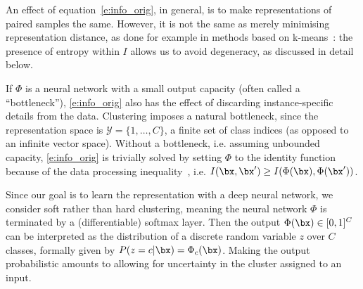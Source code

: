 An effect of equation~\cref{e:info_orig}, in general, is to make representations of paired samples the same.
However, it is not the same as merely minimising representation distance, as done for example in methods based on k-means~\cite{caron2018deep,haeusser2018associative}: the presence of entropy within $I$ allows us to avoid degeneracy, as discussed in detail below.



If $\Phi$ is a neural network with a small output capacity (often called a ``bottleneck''), \cref{e:info_orig} also has the effect of discarding instance-specific details from the data.
Clustering imposes a natural bottleneck, since the representation space is $\mathcal{Y}=\{1,\dots,C\}$, a finite set of class indices (as opposed to an infinite vector space). 
Without a bottleneck, i.e. assuming unbounded capacity, \cref{e:info_orig} is trivially solved by setting $\Phi$ to the identity function because of the data processing inequality~\cite{cover2012elements}, i.e. $I(\bx, \bx') \geq I(\Phi(\bx), \Phi(\bx'))$.

\newcommand{\bPhi}{\Phi}

Since our goal is to learn the representation with a deep neural network, we consider soft rather than hard clustering, meaning the neural network $\bPhi$ is terminated by a (differentiable) softmax layer.
Then the output $\bPhi(\bx) \in [0,1]^C$ can be interpreted as the distribution of a discrete random variable $z$ over $C$ classes, formally given by $P(z = c|\bx) = \bPhi_c(\bx)$. Making the output probabilistic amounts to allowing for uncertainty in the cluster assigned to an input.

